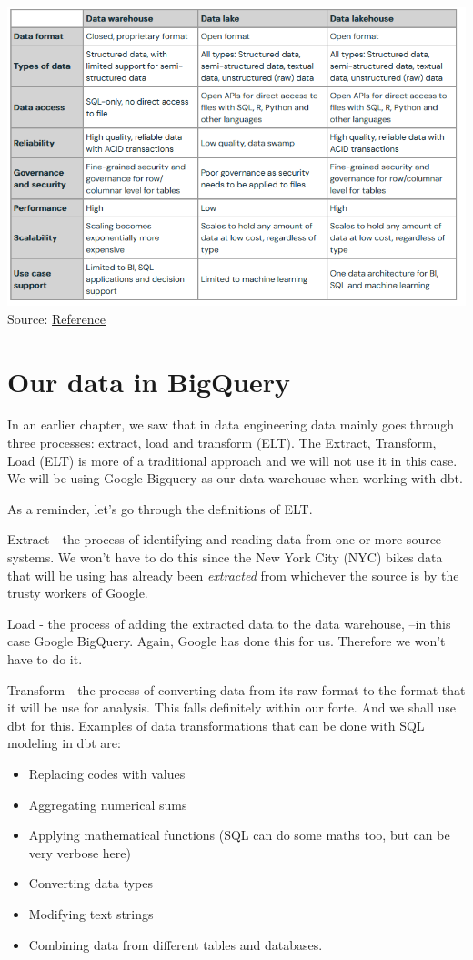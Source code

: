 \documentclass[
]{book}
\providecommand{\tightlist}{%
  \setlength{\itemsep}{0pt}\setlength{\parskip}{0pt}}
\begin{document}
\includegraphics{./images/data_storages.png}
Source: \href{https://www.databricks.com/blog/2021/05/19/evolution-to-the-data-lakehouse.html}{Reference}

\hypertarget{our-data-in-bigquery}{%
\chapter{Our data in BigQuery}\label{our-data-in-bigquery}}

In an earlier chapter, we saw that in data engineering data mainly goes through three processes: extract, load and transform (ELT). The Extract, Transform, Load (ELT) is more of a traditional approach and we will not use it in this case. We will be using Google Bigquery as our data warehouse when working with dbt.

As a reminder, let's go through the definitions of ELT.

Extract - the process of identifying and reading data from one or more source systems. We won't have to do this since the New York City (NYC) bikes data that will be using has already been \emph{extracted} from whichever the source is by the trusty workers of Google.

Load - the process of adding the extracted data to the data warehouse, --in this case Google BigQuery. Again, Google has done this for us. Therefore we won't have to do it.

Transform - the process of converting data from its raw format to the format that it will be use for analysis. This falls definitely within our forte. And we shall use dbt for this. Examples of data transformations that can be done with SQL modeling in dbt are:

\begin{itemize}
\tightlist
\item
  Replacing codes with values
\item
  Aggregating numerical sums
\item
  Applying mathematical functions (SQL can do some maths too, but can be very verbose here)
\item
  Converting data types
\item
  Modifying text strings
\item
  Combining data from different tables and databases.
\end{itemize}
\end{document}
